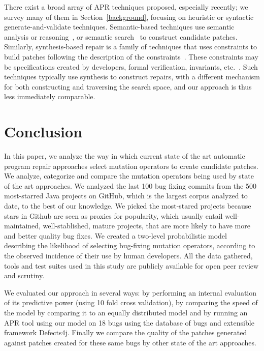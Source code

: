 \documentclass[conference]{IEEEtran}
\begin{document}
There exist a broad array of APR techniques proposed, especially recently; we
survey many of them in Section~\ref{background}, focusing on heuristic or
syntactic generate-and-validate techniques.  Semantic-based techniques use
semantic analysis or reasoning~\cite{nguyen13,mechtaev15,Mechtaev2016}, or
semantic search~\cite{ke15} to construct candidate patches.  Similarly,
synthesis-based repair is a family of techniques that uses constraints to build
patches following the description of the constraints~\cite{jin11,wei10}. These constraints may be
specifications created by developers, formal verification, invariants,
etc.~\cite{jin11,wei10}.  Such techniques typically use synthesis to construct
repairs, with a different mechanism for both constructing and traversing the
search space, and our approach is thus less immediately comparable.
 

\section{Conclusion} \label{conclusion}

In this paper, we analyze the way in which current state of the art automatic 
program repair approaches select mutation operators to create candidate 
patches. We analyze, categorize and compare the mutation operators being used by 
state of the art approaches. We analyzed the last 100 bug fixing commits from 
the
500 most-starred Java projects on GitHub, which is the largest corpus analyzed
to date, to the best of our knowledge. We picked the most-stared projects because stars in Github are seen as proxies for popularity, which usually entail well-maintained, well-stablished, mature projects, that are more likely to have more and better quality bug fixes. We created a two-level probabilistic 
model describing
the likelihood of selecting bug-fixing mutation operators, according to the
observed incidence of their use by human developers. All the data gathered, 
tools and test suites used in this study are publicly available for open peer review 
and scrutiny.

We evaluated our approach in several ways: by performing an internal 
evaluation of 
its predictive power (using 10 fold cross 
validation), by comparing the speed of the model by comparing it to an equally 
distributed model and by
 running an APR tool using our model on 18 bugs using the database of bugs and extensible 
framework Defects4j. Finally we compare the quality of the patches 
generated against patches created for these same bugs by other state of the art 
approaches. 
\end{document}
